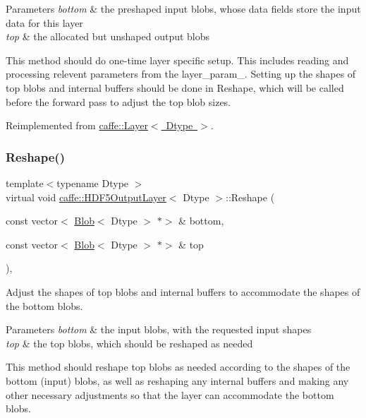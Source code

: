 \begin{DoxyParams}{Parameters}
{\em bottom} & the preshaped input blobs, whose data fields store the input data for this layer \\
\hline
{\em top} & the allocated but unshaped output blobs\\
\hline
\end{DoxyParams}
This method should do one-\/time layer specific setup. This includes reading and processing relevent parameters from the {\ttfamily layer\+\_\+param\+\_\+}. Setting up the shapes of top blobs and internal buffers should be done in {\ttfamily Reshape}, which will be called before the forward pass to adjust the top blob sizes. 

Reimplemented from \mbox{\hyperlink{classcaffe_1_1_layer_a481323a3e0972c682787f2137468c29f}{caffe\+::\+Layer$<$ Dtype $>$}}.

\mbox{\label{classcaffe_1_1_h_d_f5_output_layer_afaed17dc14251e627764334d54e55c4d}} 
\subsubsection{\texorpdfstring{Reshape()}{Reshape()}\hspace{0.1cm}{\footnotesize\ttfamily [1/2]}}
{\footnotesize\ttfamily template$<$typename Dtype $>$ \\
virtual void \mbox{\hyperlink{classcaffe_1_1_h_d_f5_output_layer}{caffe\+::\+H\+D\+F5\+Output\+Layer}}$<$ Dtype $>$\+::Reshape (\begin{DoxyParamCaption}\item[{const vector$<$ \mbox{\hyperlink{classcaffe_1_1_blob}{Blob}}$<$ Dtype $>$ $\ast$$>$ \&}]{bottom,  }\item[{const vector$<$ \mbox{\hyperlink{classcaffe_1_1_blob}{Blob}}$<$ Dtype $>$ $\ast$$>$ \&}]{top }\end{DoxyParamCaption})\hspace{0.3cm}{\ttfamily [inline]}, {\ttfamily [virtual]}}



Adjust the shapes of top blobs and internal buffers to accommodate the shapes of the bottom blobs. 


\begin{DoxyParams}{Parameters}
{\em bottom} & the input blobs, with the requested input shapes \\
\hline
{\em top} & the top blobs, which should be reshaped as needed\\
\hline
\end{DoxyParams}
This method should reshape top blobs as needed according to the shapes of the bottom (input) blobs, as well as reshaping any internal buffers and making any other necessary adjustments so that the layer can accommodate the bottom blobs. 

